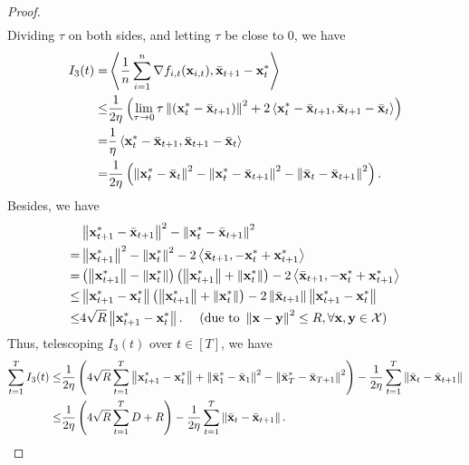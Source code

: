 \documentclass{article}
\begin{document}
\begin{proof}
\begin{align}
\end{align} Dividing $\tau$ on both sides, and letting $\tau$ be close to $0$, we have
\begin{align}
\nonumber
I_3(t) = & \left\langle\frac{1}{n}\sum_{i=1}^n \nabla f_{i,t}({\bf x}_{i,t}), \bar{{\bf x}}_{t+1} - {\bf x}_t^\ast \right\rangle \\ \nonumber 
\le & \frac{1}{2\eta}\left(  \lim_{\tau \rightarrow 0}\tau \left\lVert\left( {\bf x}_t^\ast - \bar{{\bf x}}_{t+1} \right)\right\rVert^2 + 2\left\langle {\bf x}_t^\ast - \bar{{\bf x}}_{t+1}, \bar{{\bf x}}_{t+1} - \bar{{\bf x}}_t  \right\rangle  \right) \\ \nonumber
= & \frac{1}{\eta}\left\langle {\bf x}_t^\ast - \bar{{\bf x}}_{t+1}, \bar{{\bf x}}_{t+1} - \bar{{\bf x}}_t  \right\rangle \\ \label{equa_I3_temp}
= & \frac{1}{2\eta}\left(  \left\lVert{\bf x}_t^\ast - \bar{{\bf x}}_t\right\rVert^2 - \left\lVert{\bf x}_t^\ast - \bar{{\bf x}}_{t+1}\right\rVert^2 - \left\lVert\bar{{\bf x}}_t - \bar{{\bf x}}_{t+1}\right\rVert^2  \right). 
\end{align} Besides, we have
\begin{align}
\nonumber
& \left\lVert{\bf x}_{t+1}^\ast - \bar{{\bf x}}_{t+1}\right\rVert^2 - \left\lVert{\bf x}_t^\ast - \bar{{\bf x}}_{t+1}\right\rVert^2 \\ \nonumber 
= & \left\lVert{\bf x}_{t+1}^\ast\right\rVert^2 - \left\lVert{\bf x}_t^\ast\right\rVert^2 - 2\left\langle\bar{{\bf x}}_{t+1}, -{\bf x}_t^\ast + {\bf x}_{t+1}^\ast \right\rangle \\ \nonumber
= & \left( \left\lVert{\bf x}_{t+1}^\ast\right\rVert - \left\lVert{\bf x}_t^\ast\right\rVert \right) \left( \left\lVert{\bf x}_{t+1}^\ast\right\rVert + \left\lVert{\bf x}_t^\ast\right\rVert \right) - 2\left\langle\bar{{\bf x}}_{t+1}, -{\bf x}_t^\ast + {\bf x}_{t+1}^\ast \right\rangle \\ \nonumber
\le & \left\lVert{\bf x}_{t+1}^\ast - {\bf x}_t^\ast\right\rVert \left( \left\lVert{\bf x}_{t+1}^\ast\right\rVert + \left\lVert{\bf x}_t^\ast\right\rVert \right) - 2\left\lVert\bar{{\bf x}}_{t+1}\right\rVert \left\lVert{\bf x}_{t+1}^\ast-{\bf x}_t^\ast\right\rVert \\ \nonumber
\le & 4\sqrt{R}\left\lVert{\bf x}_{t+1}^\ast - {\bf x}_t^\ast\right\rVert.    ~~~~(\text{due to } \left\lVert{\bf x} - {\bf y}\right\rVert^2 \le R, \forall {\bf x}, {\bf y}\in{\mathcal{X}}) 
\end{align} Thus, telescoping $I_3(t)$ over $t\in[T]$, we have 
\begin{align}
\nonumber
\sum_{t=1}^T I_3(t) \le & \frac{1}{2\eta}\left(  4\sqrt{R}\sum_{t=1}^T\left\lVert{\bf x}_{t+1}^\ast - {\bf x}_t^\ast\right\rVert + \left\lVert\bar{{\bf x}}_1^\ast - \bar{{\bf x}}_1\right\rVert^2 - \left\lVert\bar{{\bf x}}_T^\ast - \bar{{\bf x}}_{T+1}\right\rVert^2  \right) - \frac{1}{2\eta} \sum_{t=1}^T \left\lVert\bar{{\bf x}}_t - \bar{{\bf x}}_{t+1}\right\rVert \\ \nonumber
\le & \frac{1}{2\eta}\left(  4\sqrt{R}\sum_{t=1}^T D + R  \right) - \frac{1}{2\eta} \sum_{t=1}^T \left\lVert\bar{{\bf x}}_t - \bar{{\bf x}}_{t+1} \right\rVert.
\end{align} 



\end{proof}
\end{document}
